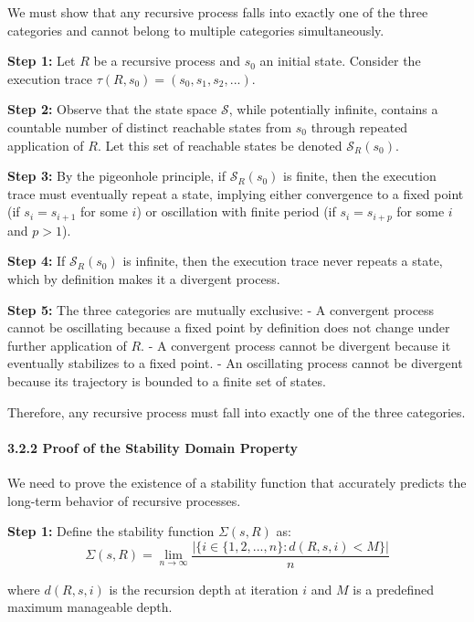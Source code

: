\documentclass[
]{article}
\begin{document}
We must show that any recursive process falls into exactly one of the
three categories and cannot belong to multiple categories
simultaneously.

\textbf{Step 1:} Let \(R\) be a recursive process and \(s_0\) an initial
state. Consider the execution trace
\(\tau(R, s_0) = (s_0, s_1, s_2, ...)\).

\textbf{Step 2:} Observe that the state space \(\mathcal{S}\), while
potentially infinite, contains a countable number of distinct reachable
states from \(s_0\) through repeated application of \(R\). Let this set
of reachable states be denoted \(\mathcal{S}_R(s_0)\).

\textbf{Step 3:} By the pigeonhole principle, if \(\mathcal{S}_R(s_0)\)
is finite, then the execution trace must eventually repeat a state,
implying either convergence to a fixed point (if \(s_i = s_{i+1}\) for
some \(i\)) or oscillation with finite period (if \(s_i = s_{i+p}\) for
some \(i\) and \(p > 1\)).

\textbf{Step 4:} If \(\mathcal{S}_R(s_0)\) is infinite, then the
execution trace never repeats a state, which by definition makes it a
divergent process.

\textbf{Step 5:} The three categories are mutually exclusive: - A
convergent process cannot be oscillating because a fixed point by
definition does not change under further application of \(R\). - A
convergent process cannot be divergent because it eventually stabilizes
to a fixed point. - An oscillating process cannot be divergent because
its trajectory is bounded to a finite set of states.

Therefore, any recursive process must fall into exactly one of the three
categories.

\paragraph{3.2.2 Proof of the Stability Domain
Property}\label{proof-of-the-stability-domain-property}

We need to prove the existence of a stability function that accurately
predicts the long-term behavior of recursive processes.

\textbf{Step 1:} Define the stability function \(\Sigma(s, R)\) as:
\[\Sigma(s, R) = \lim_{n \to \infty} \frac{|\{i \in \{1,2,...,n\} : d(R, s, i) < M\}|}{n}\]

where \(d(R, s, i)\) is the recursion depth at iteration \(i\) and \(M\)
is a predefined maximum manageable depth.
\end{document}

